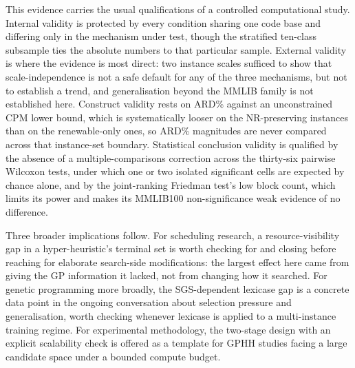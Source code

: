 This evidence carries the usual qualifications of a controlled
computational study. Internal validity is protected by every condition
sharing one code base and differing only in the mechanism under test,
though the stratified ten-class subsample ties the absolute numbers to
that particular sample. External validity is where the evidence is most
direct: two instance scales sufficed to show that scale-independence is
not a safe default for any of the three mechanisms, but not to establish a
trend, and generalisation beyond the MMLIB family is not established here.
\label{subsec:threats-construct}
Construct validity rests on ARD\% against an unconstrained CPM lower
bound, which is systematically looser on the NR-preserving instances than
on the renewable-only ones, so ARD\% magnitudes are never compared across
that instance-set boundary.
\label{subsec:threats-stat}
Statistical conclusion validity is qualified by the absence of a
multiple-comparisons correction across the thirty-six pairwise Wilcoxon
tests, under which one or two isolated significant cells are expected by
chance alone, and by the joint-ranking Friedman test's low block count,
which limits its power and makes its MMLIB100 non-significance weak
evidence of no difference.

Three broader implications follow. For scheduling research, a
resource-visibility gap in a hyper-heuristic's terminal set is worth
checking for and closing before reaching for elaborate search-side
modifications: the largest effect here came from giving the GP information
it lacked, not from changing how it searched. For genetic programming more
broadly, the SGS-dependent lexicase gap is a concrete data point in the
ongoing conversation about selection pressure and generalisation, worth
checking whenever lexicase is applied to a multi-instance training regime.
For experimental methodology, the two-stage design with an explicit
scalability check is offered as a template for GPHH studies facing a large
candidate space under a bounded compute budget.


